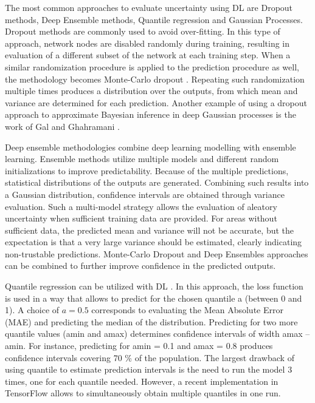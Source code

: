 \documentclass[pdflatex,sn-mathphys]{sn-jnl}%
\theoremstyle{thmstyleone}%
\theoremstyle{thmstyletwo}%
\theoremstyle{thmstylethree}%
\begin{document}
The most common approaches to evaluate uncertainty using DL are Dropout methods, Deep Ensemble methods, Quantile regression and Gaussian Processes.
Dropout methods are commonly used to avoid over-fitting. In this type of approach, network nodes are disabled randomly during training, resulting in evaluation of a different subset of the network at each training step. When a similar randomization procedure is applied to the prediction procedure as well, the methodology becomes Monte-Carlo dropout \cite{seoh2020qualitative}. Repeating such randomization multiple times produces a distribution over the outputs, from which mean and variance are determined for each prediction. Another example of using a dropout approach to approximate Bayesian inference in deep Gaussian processes is the work of Gal and Ghahramani \cite{gal2016dropout}.


Deep ensemble methodologies \cite{jain2020maximizing,ganaie2021ensemble,fort2019deep,lakshminarayanan2016simple} combine deep learning modelling with ensemble learning. Ensemble methods utilize multiple models and different random initializations to improve predictability. Because of the multiple predictions, statistical distributions of the outputs are generated. Combining such results into a Gaussian distribution, confidence intervals are obtained through variance evaluation. Such a multi-model strategy allows the evaluation of aleatory uncertainty when sufficient training data are provided. For areas without sufficient data, the predicted mean and variance will not be accurate, but the expectation is that a very large variance should be estimated, clearly indicating non-trustable predictions. Monte-Carlo Dropout and Deep Ensembles approaches can be combined to further improve confidence in the predicted outputs. 

Quantile regression can be utilized with DL \cite{moon2021learning}. In this approach, the loss function is used in a way that allows to predict for the chosen quantile a (between 0 and 1). A choice of $a = 0.5$ corresponds to evaluating the Mean Absolute Error (MAE) and predicting the median of the distribution. Predicting for two more quantile values (amin and amax) determines confidence intervals of width amax – amin. For instance, predicting for amin = 0.1 and amax = 0.8 produces confidence intervals covering 70 \% of the population. The largest drawback of using quantile to estimate prediction intervals is the need to run the model 3 times, one for each quantile needed. However, a recent implementation in TensorFlow allows to simultaneously obtain multiple quantiles in one run.
\end{document}
